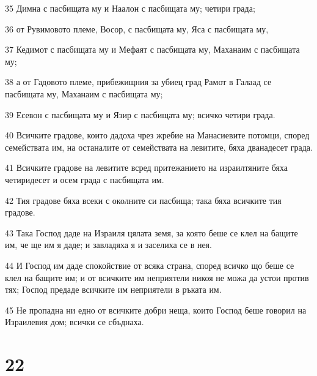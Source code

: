 \par 35 Димна с пасбищата му и Наалон с пасбищата му; четири града;
\par 36 от Рувимовото племе, Восор, с пасбищата му, Яса с пасбищата му,
\par 37 Кедимот с пасбищата му и Мефаят с пасбищата му, Маханаим с пасбищата му;
\par 38 а от Гадовото племе, прибежищния за убиец град Рамот в Галаад се пасбищата му, Маханаим с пасбищата му;
\par 39 Есевон с пасбищата му и Язир с пасбищата му; всичко четири града.
\par 40 Всичките градове, които дадоха чрез жребие на Манасиевите потомци, според семействата им, на останалите от семействата на левитите, бяха дванадесет града.
\par 41 Всичките градове на левитите всред притежанието на израилтяните бяха четиридесет и осем града с пасбищата им.
\par 42 Тия градове бяха всеки с околните си пасбища; така бяха всичките тия градове.
\par 43 Така Господ даде на Израиля цялата земя, за която беше се клел на бащите им, че ще им я даде; и завладяха я и заселиха се в нея.
\par 44 И Господ им даде спокойствие от всяка страна, според всичко що беше се клел на бащите им; и от всичките им неприятели никоя не можа да устои против тях; Господ предаде всичките им неприятели в ръката им.
\par 45 Не пропадна ни едно от всичките добри неща, които Господ беше говорил на Израилевия дом; всички се сбъднаха.

\chapter{22}

